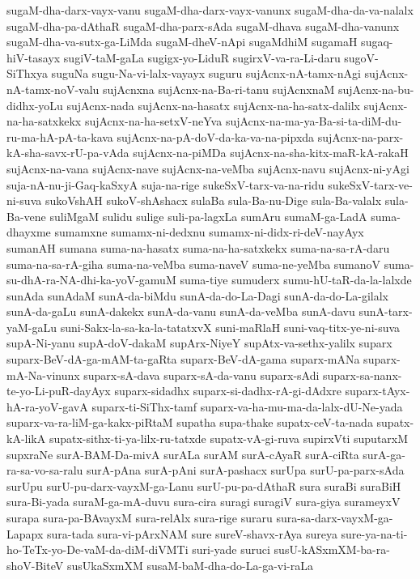 {sugaM-dha-darx-vayx-vanu
sugaM-dha-darx-vayx-vanunx
sugaM-dha-da-va-nalalx
sugaM-dha-pa-dAthaR
sugaM-dha-parx-sAda
sugaM-dhava
sugaM-dha-vanunx
sugaM-dha-va-sutx-ga-LiMda
sugaM-dheV-nApi
sugaMdhiM
sugamaH
sugaq-hiV-tasayx
sugiV-taM-gaLa
sugigx-yo-LiduR
sugirxV-va-ra-Li-daru
sugoV-SiThxya
suguNa
sugu-Na-vi-lalx-vayayx
suguru
sujAcnx-nA-tamx-nAgi
sujAcnx-nA-tamx-noV-valu
sujAcnxna
sujAcnx-na-Ba-ri-tanu
sujAcnxnaM
sujAcnx-na-bu-didhx-yoLu
sujAcnx-nada
sujAcnx-na-hasatx
sujAcnx-na-ha-satx-dalilx
sujAcnx-na-ha-satxkekx
sujAcnx-na-ha-setxV-neYva
sujAcnx-na-ma-ya-Ba-si-ta-diM-du-ru-ma-hA-pA-ta-kava
sujAcnx-na-pA-doV-da-ka-va-na-pipxda
sujAcnx-na-parx-kA-sha-savx-rU-pa-vAda
sujAcnx-na-piMDa
sujAcnx-na-sha-kitx-maR-kA-rakaH
sujAcnx-na-vana
sujAcnx-nave
sujAcnx-na-veMba
sujAcnx-navu
sujAcnx-ni-yAgi
suja-nA-nu-ji-Gaq-kaSxyA
suja-na-rige
sukeSxV-tarx-va-na-ridu
sukeSxV-tarx-ve-ni-suva
sukoVshAH
sukoV-shAshacx
sulaBa
sula-Ba-nu-Dige
sula-Ba-valalx
sula-Ba-vene
suliMgaM
sulidu
sulige
suli-pa-lagxLa
sumAru
sumaM-ga-LadA
suma-dhayxme
sumamxne
sumamx-ni-dedxnu
sumamx-ni-didx-ri-deV-nayAyx
sumanAH
sumana
suma-na-hasatx
suma-na-ha-satxkekx
suma-na-sa-rA-daru
suma-na-sa-rA-giha
suma-na-veMba
suma-naveV
suma-ne-yeMba
sumanoV
suma-su-dhA-ra-NA-dhi-ka-yoV-gamuM
suma-tiye
sumuderx
sumu-hU-taR-da-la-lalxde
sunAda
sunAdaM
sunA-da-biMdu
sunA-da-do-La-Dagi
sunA-da-do-La-gilalx
sunA-da-gaLu
sunA-dakekx
sunA-da-vanu
sunA-da-veMba
sunA-davu
sunA-tarx-yaM-gaLu
suni-Sakx-la-sa-ka-la-tatatxvX
suni-maRlaH
suni-vaq-titx-ye-ni-suva
supA-Ni-yanu
supA-doV-dakaM
supArx-NiyeY
supAtx-va-sethx-yalilx
suparx
suparx-BeV-dA-ga-mAM-ta-gaRta
suparx-BeV-dA-gama
suparx-mANa
suparx-mA-Na-vinunx
suparx-sA-dava
suparx-sA-da-vanu
suparx-sAdi
suparx-sa-nanx-te-yo-Li-puR-dayAyx
suparx-sidadhx
suparx-si-dadhx-rA-gi-dAdxre
suparx-tAyx-hA-ra-yoV-gavA
suparx-ti-SiThx-tamf
suparx-va-ha-mu-ma-da-lalx-dU-Ne-yada
suparx-va-ra-liM-ga-kakx-piRtaM
supatha
supa-thake
supatx-ceV-ta-nada
supatx-kA-likA
supatx-sithx-ti-ya-lilx-ru-tatxde
supatx-vA-gi-ruva
supirxVti
suputarxM
supxraNe
surA-BAM-Da-mivA
surALa
surAM
surA-cAyaR
surA-ciRta
surA-ga-ra-sa-vo-sa-ralu
surA-pAna
surA-pAni
surA-pashacx
surUpa
surU-pa-parx-sAda
surUpu
surU-pu-darx-vayxM-ga-Lanu
surU-pu-pa-dAthaR
sura
suraBi
suraBiH
sura-Bi-yada
suraM-ga-mA-duvu
sura-cira
suragi
suragiV
sura-giya
surameyxV
surapa
sura-pa-BAvayxM
sura-relAlx
sura-rige
suraru
sura-sa-darx-vayxM-ga-Lapapx
sura-tada
sura-vi-pArxNAM
sure
sureV-shavx-rAya
sureya
sure-ya-na-ti-ho-TeTx-yo-De-vaM-da-diM-diVMTi
suri-yade
suruci
susU-kASxmXM-ba-ra-shoV-BiteV
susUkaSxmXM
susaM-baM-dha-do-La-ga-vi-raLa
}
